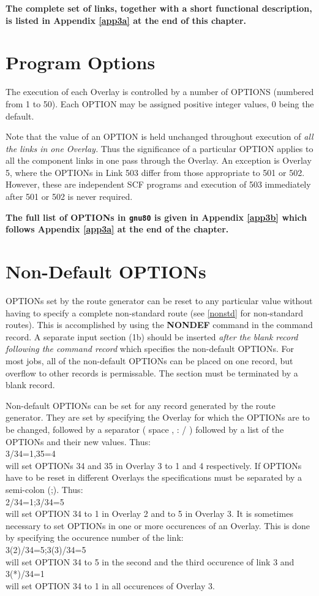 {\bf The complete set of links, together with a short functional
description, is listed in Appendix \ref{app3a} at the end of this chapter.}
\section{\sf Program Options}
The execution of each Overlay is controlled by a number of OPTIONS
(numbered from 1 to 50). Each OPTION may be assigned positive integer
values, 0 being the default. 

Note that the value of an OPTION is held
unchanged throughout execution of {\em all the links in one Overlay.} 
Thus
the significance of a particular OPTION applies to all the component
links in one pass through the Overlay. An exception is Overlay 5, where
the OPTIONs in Link 503 differ from those appropriate to 501 or 502.
However, these are independent SCF programs and execution of 503
immediately after 501 or 502 is never required. 

{\bf The full list of
OPTIONs in {\tt gnu80} is given in Appendix \ref{app3b} which follows
Appendix \ref{app3a} at the end of the chapter.}
\section{\sf Non-Default OPTIONs}
\label{nondef}
OPTIONs set by the route generator can be reset to any particular
value without having to specify a complete non-standard route (see 
\ref{nonstd} for non-standard routes).
This is accomplished by using the {\bf NONDEF} command 
in the command record.
A separate input section (1b) should be inserted {\em after the
blank record following the command record} which specifies 
the non-default OPTIONs.
For most jobs, all of the non-default OPTIONs can be placed on one
record, but overflow to other records is permissable. The section must be
terminated by a blank record.

Non-default OPTIONs can be set for any record generated by the route
generator. They are set by specifying the Overlay for which the OPTIONs
are to be changed, followed by a separator ( space , : / ) followed
by a list of the OPTIONs and their new values. 
Thus: \\
3/34=1,35=4 \\
will set OPTIONs 34 and 35 in Overlay 3 to 1 and 4 respectively.
If OPTIONs have to be reset in different Overlays the
specifications must be separated by a semi-colon (;). 
Thus:  \\
2/34=1;3/34=5  \\
will set OPTION 34 to 1 in Overlay 2 and to 5 in Overlay 3.
It is sometimes necessary to set OPTIONs in one or more occurences
of an Overlay. This is done by specifying the occurence number of the
link:  \\
3(2)/34=5;3(3)/34=5   \\
will set OPTION 34 to 5 in the second and the third
occurence of link 3  and  \\
3(*)/34=1  \\
will set OPTION 34 to 1 in all occurences of Overlay 3.
